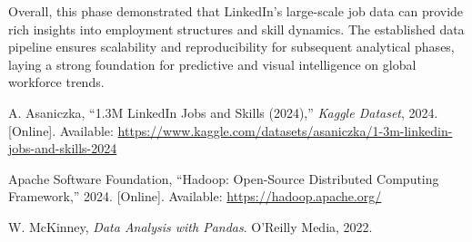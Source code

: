 \documentclass[conference]{IEEEtran}
\begin{document}
Overall, this phase demonstrated that LinkedIn's large-scale job data can provide rich insights into employment structures and skill dynamics. The established data pipeline ensures scalability and reproducibility for subsequent analytical phases, laying a strong foundation for predictive and visual intelligence on global workforce trends.



\begin{thebibliography}{00}

A. Asaniczka, “1.3M LinkedIn Jobs and Skills (2024),” \textit{Kaggle Dataset}, 2024. [Online]. Available: \url{https://www.kaggle.com/datasets/asaniczka/1-3m-linkedin-jobs-and-skills-2024}

Apache Software Foundation, “Hadoop: Open-Source Distributed Computing Framework,” 2024. [Online]. Available: \url{https://hadoop.apache.org/}

W. McKinney, \textit{Data Analysis with Pandas}. O'Reilly Media, 2022.



\end{thebibliography}
\end{document}
